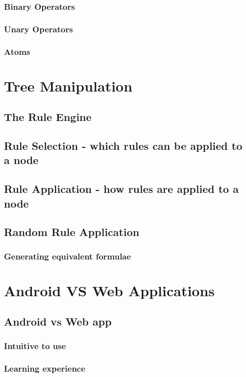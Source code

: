 \documentclass{report}
\begin{document}
\subsection{Binary Operators}
\subsection{Unary Operators}
\subsection{Atoms}

\chapter{Tree Manipulation}
\section{The Rule Engine}
\label{sec:the_rule_engine}

\section{Rule Selection - which rules can be applied to a node}
\section{Rule Application - how rules are applied to a node}
\section{Random Rule Application}
\subsection{Generating equivalent formulae}

\chapter{Android VS Web Applications}

\section{Android vs Web app}
\subsection{Intuitive to use}
\subsection{Learning experience}
\end{document}
